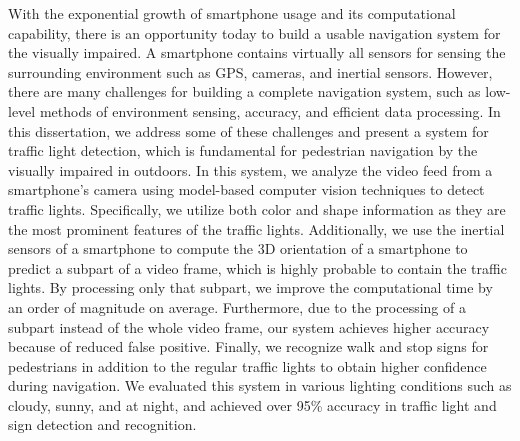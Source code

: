 \summary

With the exponential growth of smartphone usage and its computational capability, there is an opportunity today to build a usable navigation system for the visually impaired. 
A smartphone contains virtually all sensors for sensing the surrounding environment such as GPS, cameras, and inertial sensors. 
However, there are many challenges for building a complete navigation system, such as low-level methods of environment sensing, accuracy, and efficient data processing.
In this dissertation, we address some of these challenges and present a system for traffic light detection, which is fundamental for pedestrian navigation by the visually impaired in outdoors. 
In this system, we analyze the video feed from a smartphone's camera using model-based computer vision techniques to detect traffic lights. 
Specifically, we utilize both color and shape information as they are the most prominent features of the traffic lights.
Additionally, we use the inertial sensors of a smartphone to compute the 3D orientation of a smartphone to predict a subpart of a video frame, which is highly probable to contain the traffic lights. 
By processing only that subpart, we improve the computational time by an order of magnitude on average. 
Furthermore, due to the processing of a subpart instead of the whole video frame, our system achieves higher accuracy because of reduced false positive.
Finally, we recognize walk and stop signs for pedestrians in addition to the regular traffic lights to obtain higher confidence during navigation. 
We evaluated this system in various lighting conditions such as cloudy, sunny, and at night, and achieved over 95\% accuracy in traffic light and sign detection and recognition.


